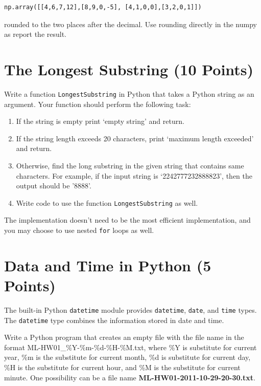 \documentclass[12pt, xcolor=dvipsnames,svgnames,x11names]{article}
\begin{document}
\begin{verbatim}
np.array([[4,6,7,12],[8,9,0,-5], [4,1,0,0],[3,2,0,1]])
\end{verbatim}

rounded to the two places after the decimal. Use rounding directly in the numpy as report the result.

\section{The Longest Substring (10 Points)}
Write a function \texttt{LongestSubstring} in Python that takes a Python string as an argument. Your function should perform the following task:

\begin{enumerate}
   \item If the string is empty print `empty string' and return.
   \item If the string length exceeds 20 characters, print `maximum length exceeded' and return.
   \item Otherwise, find the long substring in the given string that contains same characters. For example, if the input string is `2242777232888823', then the output should be '8888'.
   \item Write code to use the function \texttt{LongestSubstring} as well.
\end{enumerate}
The implementation doesn't need to be the most efficient implementation, and you may choose to use nested \texttt{for} loops as well.


\section{Data and Time in Python (5 Points)}
The built-in Python \texttt{datetime} module provides \texttt{datetime}, \texttt{date}, and \texttt{time} types. The \texttt{datetime} type combines the information stored in date and time.

Write a Python program that creates an empty file with the file name in the format ML-HW01\_\%Y-\%m-\%d-\%H-\%M.txt, where \%Y is substitute for current year,  \%m is the substitute for current month, \%d is substitute for current day, \%H is the substitute for current hour, and \%M is the substitute for current minute. One possibility can be a file name \textbf{ML-HW01-2011-10-29-20-30.txt}.
\end{document}
